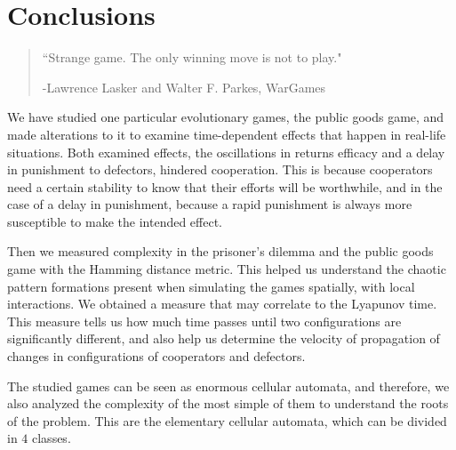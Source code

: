 \chapter{Conclusions}
\label{chap:Conclusions}



\begin{quotation}
	\vspace{-3cm}
    \begin{flushright}
    \begin{minipage}[t][5cm][b]{0.5\textwidth}
    { ``Strange game. The only winning move is not to play."}
    
    \bigskip
    
    -{\small  Lawrence Lasker and Walter F. Parkes, WarGames}
    \end{minipage}
    \end{flushright}
    
    \vspace{0.5cm}
\end{quotation}





We have studied one particular evolutionary games, the public goods game, and made alterations to it to examine time-dependent effects that happen in real-life situations. Both examined effects, the oscillations in returns efficacy and a delay in punishment to defectors, hindered cooperation. This is because cooperators need a certain stability to know that their efforts will be worthwhile, and in the case of a delay in punishment, because a rapid punishment is always more susceptible to make the intended effect.

Then we measured complexity in the prisoner's dilemma and the public goods game with the Hamming distance metric. This helped us understand the chaotic pattern formations present when simulating the games spatially, with local interactions. We obtained a measure that may correlate to the Lyapunov time. This measure tells us how much time passes until two configurations are significantly different, and also help us determine the velocity of propagation of changes in configurations of cooperators and defectors.

The studied games can be seen as enormous cellular automata, and therefore, we also analyzed the complexity of the most simple of them to understand the roots of the problem. This are the elementary cellular automata, which can be divided in $4$ classes. 

